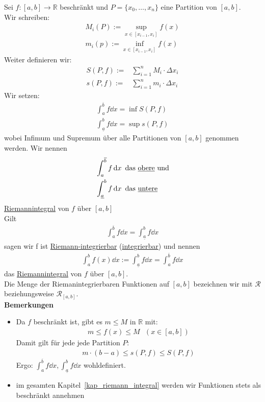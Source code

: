 \begin{Definition}{ \label{def_riemann-integrierbar}
	Sei $f : [a,b] \rightarrow \mathbb{R}$ beschränkt und $P = \{x_0, \hdots, x_n\}$ 
	eine Partition von $[a,b]$.\\
	Wir schreiben: 
	\begin{align*}
		M_i(P) := \sup_{x \in [x_{i-1}, x_i]} f(x) \\
		m_i(p) := \inf_{x \in [x_{i-1}, x_i]} f(x)
	\end{align*}
	Weiter definieren wir: 
	\begin{align*}
		S(P,f) := & \sum_{i=1}^n M_i \cdot \Delta x_i \\
		s(P,f) := & \sum_{i=1}^n m_i \cdot \Delta x_i
	\end{align*}
	Wir setzen:
	\begin{align*}
		\int_a^{\overline{b}} f \dd{x} = \inf S(P,f) \\
		\int_{\underline{a}}^b f \dd{x} = \sup s(P,f)
	\end{align*}
	wobei Infimum und Supremum über alle Partitionen von $[a,b]$ genommen werden. 
	Wir nennen 
	\begin{align*}
		& \int_a^{\overline{b}} f \dd{x} \text{ das \underline{obere} und} \\
		& \int_{\underline{a}}^b f \dd{x} \text{ das \underline{untere}}
	\end{align*}
	\underline{Riemannintegral} von $f$ über $[a,b]$ \\
	Gilt 
	\begin{align*}
		\int_a^{\overline{b}} f \dd{x} = \int_{\underline{a}}^b f \dd{x}
	\end{align*}
	sagen wir f ist \underline{Riemann-integrierbar} (\underline{integrierbar}) 
	und nennen 
	\begin{align*}
		\int_a^b f(x) \dd{x} := \int_{\underline{a}}^b f \dd{x} = 
		\int_a^{\overline{b}} f \dd{x}
	\end{align*}
	das \underline{Riemannintegral} von $f$ über $[a,b]$.\\
	Die Menge der Riemanintegrierbaren Funktionen auf $[a,b]$ bezeichnen wir 
	mit $\mathcal{R}$ beziehungsweise $\mathcal{R}_{[a,b]}$.\\
	\textbf{Bemerkungen}
	\begin{itemize}
		\item Da $f$ beschränkt ist, gibt es $m \leq M$ in $\mathbb{R}$ mit:
		\begin{align*}
			m \leq f(x) \leq M \text{ }(x \in [a,b])
		\end{align*}
		Damit gilt für jede jede Partition $P$: 
		\begin{align*}
			m \cdot (b-a) \leq s(P,f) \leq S(P,f)
		\end{align*}
		Ergo: $\int_a^{\overline{b}} f \dd{x} , \int_{\underline{a}}^b f \dd{x}$ 
		wohldefiniert.
		\item im gesamten Kapitel~\ref{kap_riemann_integral}
		werden wir Funktionen stets als 
		beschränkt annehmen
	\end{itemize}
	
}\end{Definition}

